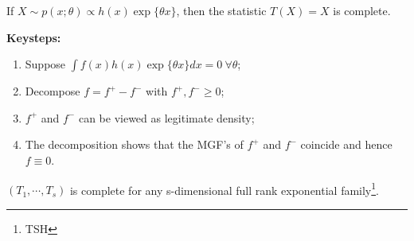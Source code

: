 \begin{exercise}
    If $X\sim p(x;\theta)\propto h(x)\exp\{\theta x\}$, then the statistic $T(X)=X$ is complete.

    \textbf{Keysteps:}
    \begin{enumerate}[{(1)}]
        \item Suppose $\int{f(x)h(x)\exp\{\theta x\}}dx=0~\forall{\theta}$;
        \item Decompose $f=f^+-f^-$ with $f^+,f^-\geq 0$;
        \item $f^+$ and $f^-$ can be viewed as legitimate density;
        \item The decomposition shows that the MGF's of $f^+$ and $f^-$ coincide and hence $f\equiv{0}$.
    \end{enumerate}
\end{exercise}

\begin{theorem}
    $(T_1,\cdots,T_s)$ is complete for any s-dimensional full rank exponential family\footnote{TSH}.
\end{theorem}

